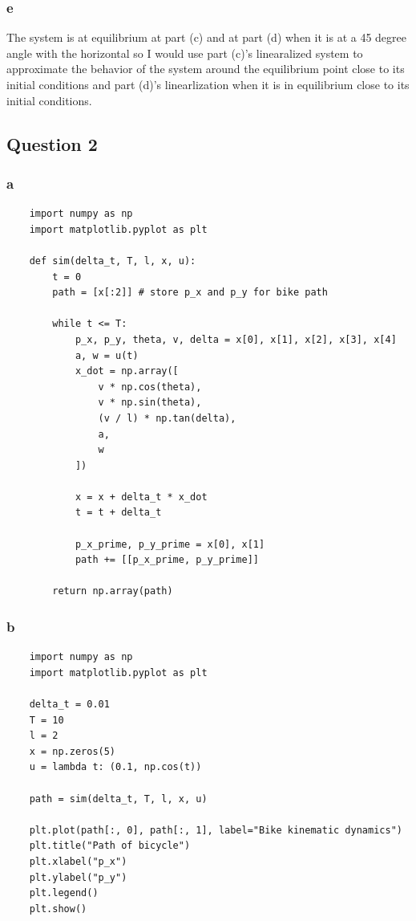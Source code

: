 \documentclass[11pt]{article}
\begin{document}
\subsubsection{e}

The system is at equilibrium at part (c) and at part (d) when it is at a 45 degree angle with the horizontal so I would use part (c)'s linearalized system to approximate the behavior of the system around the equilibrium point close to its initial conditions and part (d)'s linearlization when it is in equilibrium close to its initial conditions.

\subsection{Question 2}

\subsubsection{a}

\begin{verbatim}
    import numpy as np
    import matplotlib.pyplot as plt

    def sim(delta_t, T, l, x, u):
        t = 0
        path = [x[:2]] # store p_x and p_y for bike path

        while t <= T:
            p_x, p_y, theta, v, delta = x[0], x[1], x[2], x[3], x[4]
            a, w = u(t)
            x_dot = np.array([
                v * np.cos(theta),
                v * np.sin(theta),
                (v / l) * np.tan(delta),
                a,
                w
            ])

            x = x + delta_t * x_dot
            t = t + delta_t

            p_x_prime, p_y_prime = x[0], x[1]
            path += [[p_x_prime, p_y_prime]]
        
        return np.array(path)
\end{verbatim}

\subsubsection{b}

\begin{verbatim}
    import numpy as np
    import matplotlib.pyplot as plt

    delta_t = 0.01
    T = 10
    l = 2
    x = np.zeros(5)
    u = lambda t: (0.1, np.cos(t))

    path = sim(delta_t, T, l, x, u)
    
    plt.plot(path[:, 0], path[:, 1], label="Bike kinematic dynamics")
    plt.title("Path of bicycle")
    plt.xlabel("p_x")
    plt.ylabel("p_y")
    plt.legend()
    plt.show()
\end{verbatim}
\end{document}
